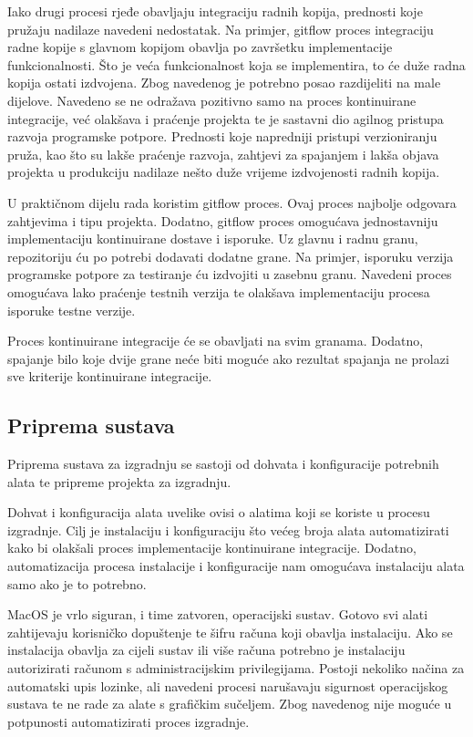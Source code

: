\documentclass[times, utf8, diplomski, numeric]{fer}
\begin{document}
Iako drugi procesi rjeđe obavljaju integraciju radnih kopija, prednosti koje pružaju nadilaze navedeni nedostatak. Na primjer, gitflow proces integraciju radne kopije s glavnom kopijom obavlja po završetku implementacije funkcionalnosti. Što je veća funkcionalnost koja se implementira, to će duže radna kopija ostati izdvojena. Zbog navedenog je potrebno posao razdijeliti na male dijelove. Navedeno se ne odražava pozitivno samo na proces kontinuirane integracije, već olakšava i praćenje projekta te je sastavni dio agilnog pristupa razvoja programske potpore. Prednosti koje napredniji pristupi verzioniranju pruža, kao što su lakše praćenje razvoja, zahtjevi za spajanjem i lakša objava projekta u produkciju nadilaze nešto duže vrijeme izdvojenosti radnih kopija.

U praktičnom dijelu rada koristim gitflow proces. Ovaj proces najbolje odgovara zahtjevima i tipu projekta. Dodatno, gitflow proces omogućava jednostavniju implementaciju kontinuirane dostave i isporuke. Uz glavnu i radnu granu, repozitoriju ću po potrebi dodavati dodatne grane. Na primjer, isporuku verzija programske potpore za testiranje ću izdvojiti u zasebnu granu. Navedeni proces omogućava lako praćenje testnih verzija te olakšava implementaciju procesa isporuke testne verzije.

Proces kontinuirane integracije će se obavljati na svim granama. Dodatno, spajanje bilo koje dvije grane neće biti moguće ako rezultat spajanja ne prolazi sve kriterije kontinuirane integracije.

\subsection{Priprema sustava}

Priprema sustava za izgradnju se sastoji od dohvata i konfiguracije potrebnih alata te pripreme projekta za izgradnju.

Dohvat i konfiguracija alata uvelike ovisi o alatima koji se koriste u procesu izgradnje. Cilj je instalaciju i konfiguraciju što većeg broja alata automatizirati kako bi olakšali proces implementacije kontinuirane integracije. Dodatno, automatizacija procesa instalacije i konfiguracije nam omogućava instalaciju alata samo ako je to potrebno.

MacOS je vrlo siguran, i time zatvoren, operacijski sustav. Gotovo svi alati zahtijevaju korisničko dopuštenje te šifru računa koji obavlja instalaciju. Ako se instalacija obavlja za cijeli sustav ili više računa potrebno je instalaciju autorizirati računom s administracijskim privilegijama. Postoji nekoliko načina za automatski upis lozinke, ali navedeni procesi narušavaju sigurnost operacijskog sustava te ne rade za alate s grafičkim sučeljem. Zbog navedenog nije moguće u potpunosti automatizirati proces izgradnje.
\end{document}
